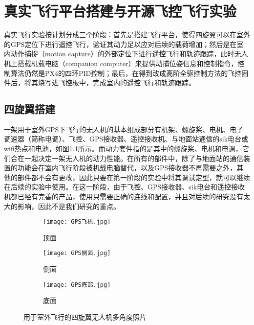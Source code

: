 \chapter{真实飞行平台搭建与开源飞控飞行实验}
真实飞行实验按计划分成三个阶段：首先是搭建飞行平台，使得四旋翼可以在室外的GPS定位下进行遥控飞行，验证其动力足以应对后续的载荷增加；然后是在室内动作捕捉（motion capture）的外部定位下进行遥控飞行和轨迹跟踪，此时无人机上搭载机载电脑（companion computer）来提供动捕位姿信息和控制指令，控制算法仍然是PX4的四环PID控制；最后，在得到改成高阶全驱控制方法的飞控固件后，将其烧写进飞控板中，完成室内的遥控飞行和轨迹跟踪。
\section{四旋翼搭建}
一架用于室外GPS下飞行的无人机的基本组成部分有机架、螺旋桨、电机、电子调速器（简称电调）、飞控、GPS接收器、遥控接收机、与地面站通信的sik电台或wifi热点和电池，如图\ref{用于室外飞行的四旋翼无人机多角度照片}所示。而动力套件指的是其中的螺旋桨、电机和电调，它们合在一起决定一架无人机的动力性能。在所有的部件中，除了与地面站的通信装置的功能会在室内飞行阶段被机载电脑替代，以及GPS接收器不再需要之外，其他的部件都不会有更改，因此只要在第一阶段的实验中将其调试定型，就可以继续在后续的实验中使用。在这一阶段，由于飞控、GPS接收器、sik电台和遥控接收机都已经有完善的产品，使用只需要正确的连线和配置，并且对后续的研究没有太大的影响，因此不是我们研究的重点。
\begin{figure}[h]
  \centering
  \begin{subfigure}[c]{0.33\textwidth}
    \centering
    \texttt{[image: GPS飞机.jpg]}
    \caption{顶面}
  \end{subfigure} \hfill
  \begin{subfigure}[c]{0.33\textwidth}
    \centering
    \texttt{[image: GPS侧面.jpg]}
    \caption{侧面}
  \end{subfigure}\hfill
    \begin{subfigure}[c]{0.33\textwidth}
      \centering
      \texttt{[image: GPS底部.jpg]}
      \caption{底面}
  \end{subfigure}
  \caption{用于室外飞行的四旋翼无人机多角度照片}
  \label{用于室外飞行的四旋翼无人机多角度照片}
  \end{figure}

